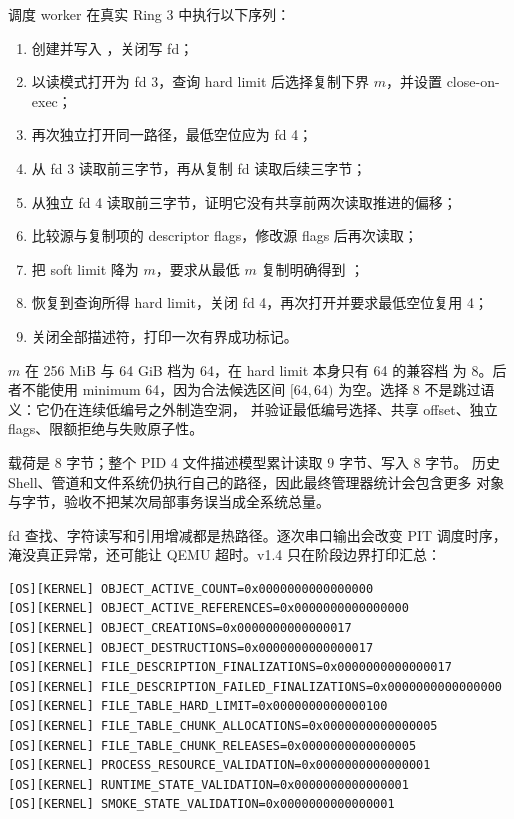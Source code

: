 调度 worker 在真实 Ring 3 中执行以下序列：

\begin{enumerate}
  \item 创建并写入 ，关闭写 fd；
  \item 以读模式打开为 fd 3，查询 hard limit 后选择复制下界 \(m\)，并设置
        close-on-exec；
  \item 再次独立打开同一路径，最低空位应为 fd 4；
  \item 从 fd 3 读取前三字节，再从复制 fd 读取后续三字节；
  \item 从独立 fd 4 读取前三字节，证明它没有共享前两次读取推进的偏移；
  \item 比较源与复制项的 descriptor flags，修改源 flags 后再次读取；
  \item 把 soft limit 降为 \(m\)，要求从最低 \(m\) 复制明确得到 ；
  \item 恢复到查询所得 hard limit，关闭 fd 4，再次打开并要求最低空位复用 4；
  \item 关闭全部描述符，打印一次有界成功标记。
\end{enumerate}

\(m\) 在 256 MiB 与 64 GiB 档为 64，在 hard limit 本身只有 64 的兼容档
为 8。后者不能使用 minimum 64，因为合法候选区间
\([64,64)\) 为空。选择 8 不是跳过语义：它仍在连续低编号之外制造空洞，
并验证最低编号选择、共享 offset、独立 flags、限额拒绝与失败原子性。

载荷是 8 字节；整个 PID 4 文件描述模型累计读取 9 字节、写入 8 字节。
历史 Shell、管道和文件系统仍执行自己的路径，因此最终管理器统计会包含更多
对象与字节，验收不把某次局部事务误当成全系统总量。

fd 查找、字符读写和引用增减都是热路径。逐次串口输出会改变 PIT 调度时序，
淹没真正异常，还可能让 QEMU 超时。v1.4 只在阶段边界打印汇总：

\begin{lstlisting}[caption={v1.4 functional 运行的代表性对象证据}]
[OS][KERNEL] OBJECT_ACTIVE_COUNT=0x0000000000000000
[OS][KERNEL] OBJECT_ACTIVE_REFERENCES=0x0000000000000000
[OS][KERNEL] OBJECT_CREATIONS=0x0000000000000017
[OS][KERNEL] OBJECT_DESTRUCTIONS=0x0000000000000017
[OS][KERNEL] FILE_DESCRIPTION_FINALIZATIONS=0x0000000000000017
[OS][KERNEL] FILE_DESCRIPTION_FAILED_FINALIZATIONS=0x0000000000000000
[OS][KERNEL] FILE_TABLE_HARD_LIMIT=0x0000000000000100
[OS][KERNEL] FILE_TABLE_CHUNK_ALLOCATIONS=0x0000000000000005
[OS][KERNEL] FILE_TABLE_CHUNK_RELEASES=0x0000000000000005
[OS][KERNEL] PROCESS_RESOURCE_VALIDATION=0x0000000000000001
[OS][KERNEL] RUNTIME_STATE_VALIDATION=0x0000000000000001
[OS][KERNEL] SMOKE_STATE_VALIDATION=0x0000000000000001
\end{lstlisting}

